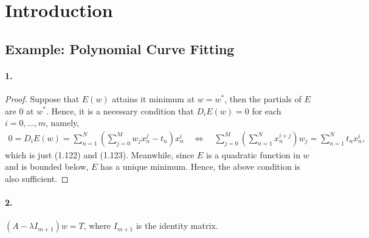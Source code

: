 \section{Introduction}
\subsection{Example: Polynomial Curve Fitting}
  \paragraph{1.}
  \begin{proof}
    Suppose that $E(w)$ attains it minimum at $w=w^*$, then the partials of $E$ 
    are $0$ at $w^*$. Hence, it is a necessary condition that $D_iE(w)=0$ for 
    each $i=0,\dots,m$, namely,
    \begin{align*}
      0=D_iE(w)=\sum_{n=1}^N\left(\sum_{j=0}^Mw_jx_n^j-t_n\right)x_n^i
      \quad\Leftrightarrow\quad
      \sum_{j=0}^M\left(\sum_{n=1}^Nx_n^{i+j}\right)w_j=\sum_{n=1}^Nt_nx_n^i,
    \end{align*}
    which is just (1.122) and (1.123). Meanwhile, since $E$ is a quadratic 
    function in $w$ and is bounded below, $E$ has a unique minimum. Hence, the
    above condition is also sufficient.
  \end{proof}

  \paragraph{2.}
  \begin{solution}
    $(A-\lambda I_{m+1})w=T$, where $I_{m+1}$ is the identity matrix.
  \end{solution}

